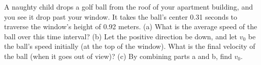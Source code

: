 %
A naughty child drops a golf ball from the roof of your apartment building,
and you see it drop past your window.
It takes the ball's center 0.31 seconds to traverse the window's
height of 0.92 meters. 
%
(a) What is the average speed of the ball over this time interval?\answercheck\hwendpart
%
(b) Let the positive direction be down, and let $v_0$ be the ball's speed initially (at the top of the window).
What is the final velocity of the ball (when it goes out of view)?\answercheck\hwendpart
%
(c) By combining  parts a and b, find $v_0$.\answercheck
